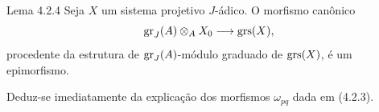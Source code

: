 \begin{statement}{Lema 4.2.4}
Seja \(X\) um sistema projetivo \(J\)-ádico. O morfismo canônico
\[
\operatorname{gr}_J(A)\otimes_A X_0\longrightarrow \operatorname{grs}(X),
\]
procedente da estrutura de \(\operatorname{gr}_J(A)\)-módulo graduado de \(\operatorname{grs}(X)\), é um epimorfismo.
\end{statement}

\begin{prooftext}
Deduz-se imediatamente da explicação dos morfismos \(\omega_{pq}\) dada em (4.2.3).
\end{prooftext}
